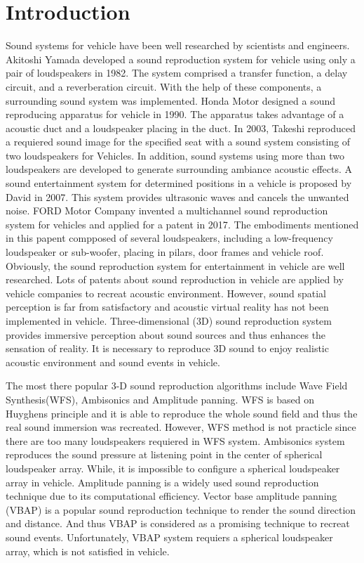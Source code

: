 \documentclass[runningheads,a4paper]{llncs}
\begin{document}
\section{Introduction}\label{sec:Intro}
Sound systems for vehicle have been well researched by scientists and engineers.   Akitoshi Yamada developed a sound reproduction system for vehicle using only a pair of loudspeakers in 1982\cite{Akito82}. The system comprised a transfer function, a delay circuit, and a reverberation circuit. With the help of these components, a surrounding sound system was implemented. 
Honda Motor designed a sound reproducing apparatus for vehicle in 1990\cite{terai1990sound}. The apparatus takes advantage of a acoustic duct and a loudspeaker placing in the duct. 
In 2003, Takeshi reproduced a requiered sound image for the specified seat with a sound system consisting of two loudspeakers for Vehicles\cite{Takeshi03}. 
In addition, sound systems using more than two loudspeakers are developed to generate surrounding ambiance acoustic effects\cite{clark1998vehicle}\cite{orellana2015loudspeaker}. A sound entertainment system for determined positions in a vehicle is proposed by David in 2007. This system provides ultrasonic waves and cancels the unwanted noise\cite{David07}. 
FORD Motor Company invented a multichannel sound reproduction system for vehicles and applied for a patent in 2017\cite{orellana2015loudspeaker}. The embodiments mentioned in this papent compposed of several loudspeakers, including a low-frequency loudspeaker or sub-woofer, placing in pilars, door frames and vehicle roof. Obviously, the sound reproduction system for entertainment in vehicle are well researched. Lots of patents about sound reproduction in vehicle are applied by vehicle companies to recreat acoustic environment\cite{Simon2005}\cite{Miriam2014}\cite{David07}\cite{Gibson15}. However, sound spatial perception is far from satisfactory and acoustic virtual reality has not been implemented in vehicle. Three-dimensional (3D) sound reproduction system provides immersive perception about sound sources and thus enhances the sensation of reality\cite{AasthaTASLP11}\cite{Danilo15TMM}\cite{zms2015}. It is necessary to reproduce 3D sound to enjoy realistic acoustic environment and sound events in vehicle.

The most there popular 3-D sound reproduction algorithms include Wave Field Synthesis(WFS), Ambisonics and Amplitude panning. WFS is based on Huyghens principle and it is able to reproduce the whole sound field and thus the real sound immersion was recreated\cite{Gergely17}. However, WFS method is not practicle since there are too many loudspeakers requiered in WFS system. Ambisonics system reproduces the sound pressure at listening point in the center of spherical loudspeaker array. While, it is impossible to configure a spherical loudspeaker array in vehicle. Amplitude panning is a widely used sound reproduction technique due to its computational efficiency. Vector base amplitude panning (VBAP) is a popular sound reproduction technique to render the sound direction and distance. And thus VBAP is considered as a promising technique to recreat sound events\cite{Pulkki01spatial}. Unfortunately, VBAP system requiers a spherical loudspeaker array, which is not satisfied in vehicle. 
\end{document}
